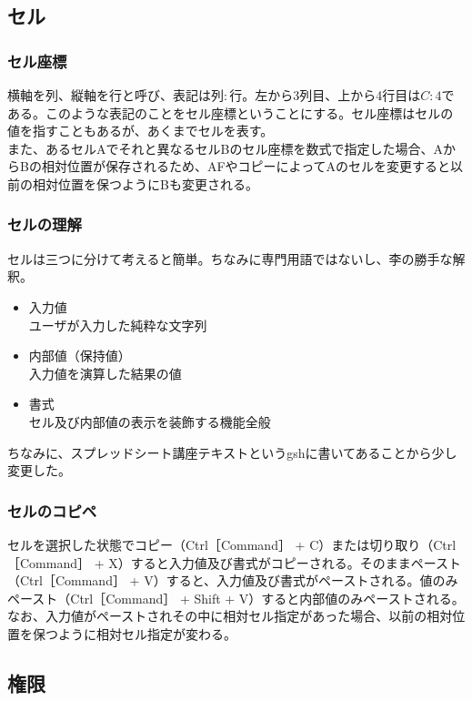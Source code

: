 \documentclass[dvipdfmx,jb5]{jreport}
\begin{document}
\subsection{セル}
\subsubsection{セル座標}
横軸を列、縦軸を行と呼び、表記は$列:行$。左から3列目、上から4行目は$C:4$である。このような表記のことをセル座標ということにする。セル座標はセルの値を指すこともあるが、あくまでセルを表す。
\\
また、あるセルAでそれと異なるセルBのセル座標を数式で指定した場合、AからBの相対位置が保存されるため、AFやコピーによってAのセルを変更すると以前の相対位置を保つようにBも変更される。
\subsubsection{セルの理解}
セルは三つに分けて考えると簡単。ちなみに専門用語ではないし、李の勝手な解釈。
\begin{itemize}
      \item 入力値\\
            ユーザが入力した純粋な文字列
      \item 内部値（保持値）\\
            入力値を演算した結果の値
      \item 書式\\
            セル及び内部値の表示を装飾する機能全般
\end{itemize}
ちなみに、スプレッドシート講座テキストというgshに書いてあることから少し変更した。
\subsubsection{セルのコピペ}
セルを選択した状態でコピー（Ctrl［Command］ + C）または切り取り（Ctrl［Command］ + X）すると入力値及び書式がコピーされる。そのままペースト（Ctrl［Command］ + V）すると、入力値及び書式がペーストされる。値のみペースト（Ctrl［Command］ + Shift + V）すると内部値のみペーストされる。
\\
なお、入力値がペーストされその中に相対セル指定があった場合、以前の相対位置を保つように相対セル指定が変わる。
\subsection{権限}
\end{document}
